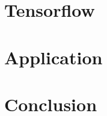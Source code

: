 \documentclass[ a4paper, 12pt, oneside, onecolumn, final, openany ]{article}
\begin{document}
    \chapter{Tensorflow}
    

    \chapter{Application}
    

    \chapter{Conclusion}
    

    \newpage

    
    
\end{document}
